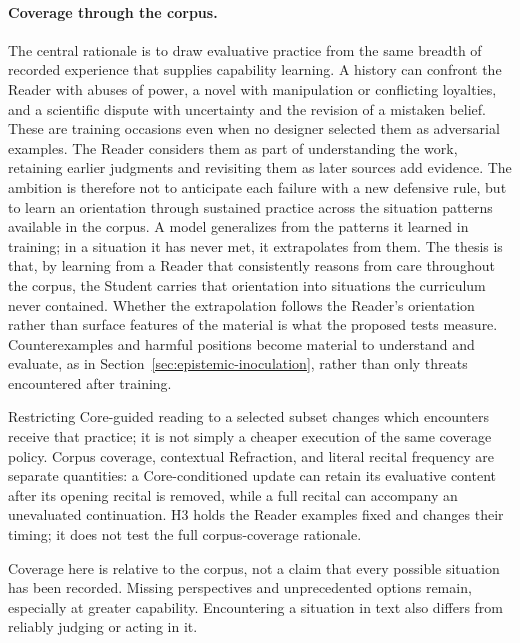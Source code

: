\documentclass[11pt]{article}
\begin{document}
\paragraph{Coverage through the corpus.} The central rationale is to draw
evaluative practice from the same breadth of recorded experience that supplies
capability learning. A history can confront the Reader with abuses of power,
a novel with manipulation or conflicting loyalties, and a scientific dispute
with uncertainty and the revision of a mistaken belief. These are training
occasions even when no designer selected them as adversarial examples. The
Reader considers them as part of understanding the work, retaining earlier
judgments and revisiting them as later sources add evidence. The ambition is
therefore not to anticipate each failure with a new defensive rule, but to
learn an orientation through sustained practice across the situation patterns
available in the corpus. A model generalizes from the patterns it learned in
training; in a situation it has never met, it extrapolates from them. The thesis
is that, by learning from a Reader that consistently reasons from care
throughout the corpus, the Student carries that orientation into situations the
curriculum never contained. Whether the extrapolation follows the Reader's
orientation rather than surface features of the material is what the proposed
tests measure. Counterexamples and harmful positions become
material to understand and evaluate, as in
Section~\ref{sec:epistemic-inoculation}, rather than only threats encountered
after training.

Restricting Core-guided reading to a selected subset changes which encounters
receive that practice; it is not simply a cheaper execution of the same
coverage policy. Corpus coverage, contextual Refraction, and literal recital
frequency are separate quantities: a Core-conditioned update can retain its
evaluative content after its opening recital is removed, while a full recital
can accompany an unevaluated continuation. H3 holds the Reader examples fixed
and changes their timing; it does not test the full corpus-coverage rationale.

Coverage here is relative to the corpus, not a claim that every possible
situation has been recorded. Missing perspectives and unprecedented options
remain, especially at greater capability. Encountering a situation in text
also differs from reliably judging or acting in it.
\end{document}

